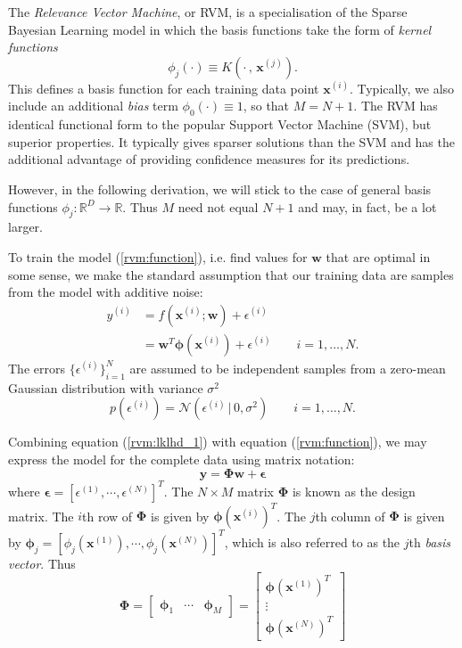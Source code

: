 The \emph{Relevance Vector Machine}, or RVM, is a specialisation of the Sparse Bayesian Learning model in which the basis functions take the form of \emph{kernel functions} 
\begin{equation*}
  \phi_j(\cdot) \equiv K\left(\cdot\,,\,\bm x^{(j)}\right).
\end{equation*}
This defines a basis function for each training data point $\bm x^{(i)}$.
Typically, we also include an additional \emph{bias} term $\phi_0(\cdot) \equiv 1$, so that $M = N+1$.
The RVM has identical functional form to the popular Support Vector Machine (SVM), but superior properties.
It typically gives sparser solutions than the SVM and has the additional advantage of providing confidence measures for its predictions.

However, in the following derivation, we will stick to the case of general basis functions $\phi_j:\mathbb{R}^D\to\mathbb{R}$.
Thus $M$ need not equal $N+1$ and may, in fact, be a lot larger.

To train the model (\ref{rvm:function}), i.e. find values for $\bm w$ that are optimal in some sense, we make the standard assumption that our training data are samples from the model with additive noise:
\begin{equation}
  \label{rvm:lklhd_1}
  \begin{split}
    y^{(i)} &= f(\bm x^{(i)}; \bm w) + \epsilon^{(i)}\\
    &= \bm w^T \bm \phi(\bm x^{(i)}) + \epsilon^{(i)}\qquad i = 1, \dots, N.
  \end{split}
\end{equation}
The errors $\{\epsilon^{(i)}\}_{i=1}^N$ are assumed to be independent samples from a zero-mean Gaussian distribution with variance $\sigma^2$
\begin{equation}
  \label{rvm:error}
  p(\epsilon^{(i)}) = \mathcal{N}(\epsilon^{(i)}\,|\,0, \sigma^2)\qquad i = 1, \dots, N.
\end{equation}

Combining equation (\ref{rvm:lklhd_1}) with equation (\ref{rvm:function}), we may express the model for the complete data using matrix notation:
\begin{equation}
  \label{rvm:lklhd_2}
  \bm y = \bm\Phi \bm w + \bm \epsilon
\end{equation}
where $\bm \epsilon = \left[\epsilon^{(1)}, \cdots, \epsilon^{(N)}\right]^T$.
The $N\times M$ matrix $\bm \Phi$ is known as the design matrix. 
The $i$th row of $\bm \Phi$ is given by $\bm \phi(\bm x^{(i)})^T$.
The $j$th column of $\bm \Phi$ is given by $\bm \phi_j = \left[\phi_j\left(\bm x^{(1)}\right), \cdots, \phi_j\left(\bm x^{(N)}\right)\right]^T$, which is also referred to as the $j$th \emph{basis vector}.
Thus
\begin{equation*}
  \bm\Phi =
  \begin{bmatrix}
    \bm\phi_1 & \cdots & \bm\phi_M
  \end{bmatrix}
  =
  \begin{bmatrix}
    \bm\phi(\bm x^{(1)})^T\\
    \vdots\\
    \bm\phi(\bm x^{(N)})^T
  \end{bmatrix}
\end{equation*}

